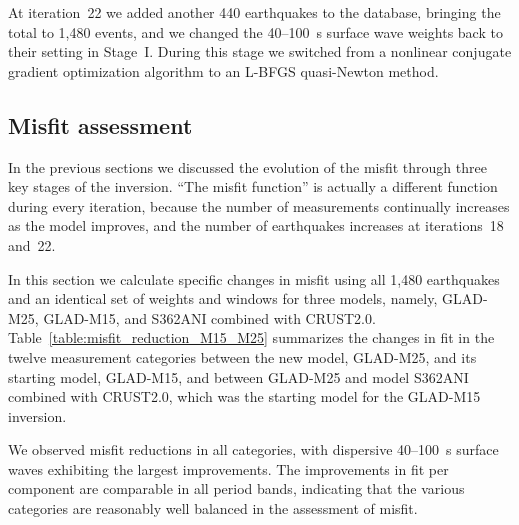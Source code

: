 \documentclass[extra,mreferee]{gji}
\begin{document}
At iteration~22 we added another 440 earthquakes to the database,
bringing the total to 1,480 events,
and we changed the 40--100~s surface wave weights back to their
setting in Stage~I. During this stage we switched from a nonlinear
conjugate gradient optimization algorithm to an L-BFGS quasi-Newton method.

\subsection{Misfit assessment}
\label{section:Misfit assessment}

In the previous sections we discussed the evolution of the misfit through
three key stages of the inversion.
``The misfit function'' is actually a different function during every iteration,
because the number of measurements continually increases as the model improves,
and the number of earthquakes increases at iterations~18 and~22.

In this section we calculate specific changes in misfit using all 1,480
earthquakes and an identical set of weights and windows for three models,
namely, GLAD-M25, GLAD-M15, and S362ANI combined with CRUST2.0.
Table~\ref{table:misfit_reduction_M15_M25} summarizes the changes in fit in
the twelve measurement categories between the new model, GLAD-M25, and its
starting model, GLAD-M15, and between GLAD-M25 and model S362ANI combined
with CRUST2.0, which was the starting model for the GLAD-M15 inversion.

We observed misfit reductions in all categories,
with dispersive 40--100~s surface waves exhibiting the largest improvements.
The improvements in fit per component are comparable in all period bands,
indicating that the various categories are reasonably well balanced in the
assessment of misfit.
\end{document}
